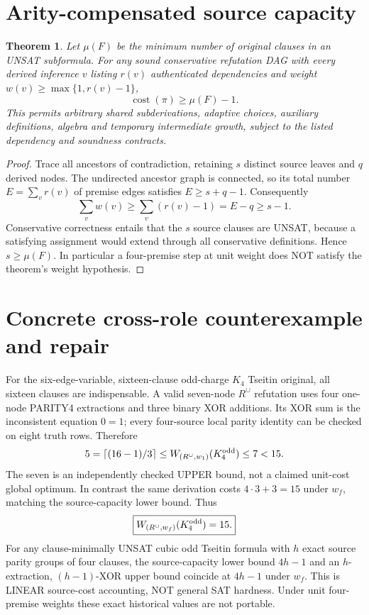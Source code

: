 \documentclass[11pt]{article}
\newtheorem{theorem}{Theorem}
\begin{document}
\section{Arity-compensated source capacity}
\begin{theorem}
Let $\mu(F)$ be the minimum number of original clauses in an UNSAT subformula. For any sound conservative refutation DAG with every derived inference $v$ listing $r(v)$ authenticated dependencies and weight $w(v)\ge\max\{1,r(v)-1\}$,
\[
\boxed{\operatorname{cost}(\pi)\ge\mu(F)-1.}
\]
This permits arbitrary shared subderivations, adaptive choices, auxiliary definitions, algebra and temporary intermediate growth, subject to the listed dependency and soundness contracts.
\end{theorem}
\begin{proof}
Trace all ancestors of contradiction, retaining $s$ distinct source leaves and $q$ derived nodes. The undirected ancestor graph is connected, so its total number $E=\sum_v r(v)$ of premise edges satisfies $E\ge s+q-1$. Consequently
\[
\sum_v w(v)\ge\sum_v(r(v)-1)=E-q\ge s-1.
\]
Conservative correctness entails that the $s$ source clauses are UNSAT, because a satisfying assignment would extend through all conservative definitions. Hence $s\ge\mu(F)$. In particular a four-premise step at unit weight does NOT satisfy the theorem's weight hypothesis.
\end{proof}
\section{Concrete cross-role counterexample and repair}
For the six-edge-variable, sixteen-clause odd-charge $K_4$ Tseitin original, all sixteen clauses are indispensable. A valid seven-node $R^{\cup}$ refutation uses four one-node PARITY4 extractions and three binary XOR additions. Its XOR sum is the inconsistent equation $0=1$; every four-source local parity identity can be checked on eight truth rows. Therefore
\[
5=\lceil(16-1)/3\rceil\le W_{(R^\cup,w_1)}(K_4^{\rm odd})\le7<15.
\]
The seven is an independently checked UPPER bound, not a claimed unit-cost global optimum. In contrast the same derivation costs $4\cdot3+3=15$ under $w_f$, matching the source-capacity lower bound. Thus
\[
\boxed{W_{(R^\cup,w_f)}(K_4^{\rm odd})=15.}
\]
For any clause-minimally UNSAT cubic odd Tseitin formula with $h$ exact source parity groups of four clauses, the source-capacity lower bound $4h-1$ and an $h$-extraction, $(h-1)$-XOR upper bound coincide at $4h-1$ under $w_f$. This is LINEAR source-cost accounting, NOT general SAT hardness. Under unit four-premise weights these exact historical values are not portable.
\end{document}
